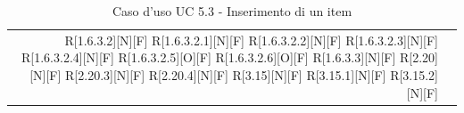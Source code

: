 \documentclass[a4paper]{article}
\begin{document}
\begin{table}[H]
\begin{tabularx}{\textwidth}{r X}
R[1.6.3.2][N][F] \newline
R[1.6.3.2.1][N][F] \newline
R[1.6.3.2.2][N][F] \newline
R[1.6.3.2.3][N][F] \newline
R[1.6.3.2.4][N][F] \newline
R[1.6.3.2.5][O][F] \newline
R[1.6.3.2.6][O][F] \newline
R[1.6.3.3][N][F] \newline
R[2.20][N][F] \newline
R[2.20.3][N][F] \newline
R[2.20.4][N][F] \newline
R[3.15][N][F] \newline
R[3.15.1][N][F] \newline
R[3.15.2][N][F]  \\
			\end{tabularx}
			\caption{Caso d'uso UC 5.3 - Inserimento di un item}
		 \end{table} 
		 
\end{document}
